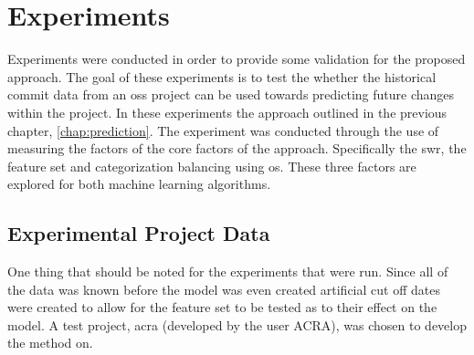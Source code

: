 \chapter{Experiments}
\label{chap:experiments}

Experiments were conducted in order to provide some validation for the proposed approach. The goal of these experiments is to test the whether the historical commit data from an \gls{oss} project can be used towards predicting future changes within the project. In these experiments the approach outlined in the previous chapter, \autoref{chap:prediction}. The experiment was conducted through the use of measuring the factors of the core factors of the approach. Specifically the \gls{swr}, the feature set and categorization balancing using \gls{os}. These three factors are explored for both machine learning algorithms.

\section{Experimental Project Data}
\label{sec:experimental_project_data}

One thing that should be noted for the experiments that were run. Since all of the data was known before the model was even created artificial cut off dates were created to allow for the feature set to be tested as to their effect on the model. A test project, acra (developed by the user ACRA), was chosen to develop the method on. 


